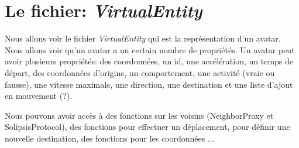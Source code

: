 \documentclass[11pt,a4paper]{article}
\begin{document}
\section{Le fichier: \textit{VirtualEntity}}
Nous allons voir le fichier \textit{VirtualEntity} qui est la représentation d'un avatar. Nous allons voir qu'un avatar a un certain nombre de propriétés. Un avatar peut avoir plusieurs propriétés: des coordonnées, un id, une accélération, un temps de départ, des coordonnées d'origine, un comportement, une activité (vraie ou fausse), une vitesse maximale, une direction, une destination et une liste d'ajout en mouvement (?).
\par Nous pouvons avoir accès à des fonctions sur les voisins (NeighborProxy et SolipsisProtocol), des fonctions pour effectuer un déplacement, pour définir une nouvelle destination, des fonctions pour les coordonnées ...

\newpage




 
\end{document}
